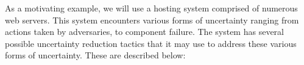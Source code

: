 \documentclass[12pt]{article}
\newcommand{\dan}[1]{\textcolor{blue}{{\it [Dan says: #1]}}}
\begin{document}
    






As a motivating example, we will use a hosting system comprised of numerous web servers. This system encounters various forms of uncertainty ranging from actions taken by adversaries, to component failure. The system has several possible uncertainty reduction tactics that it may use to address these various forms of uncertainty. These are described below: %
\end{document}
